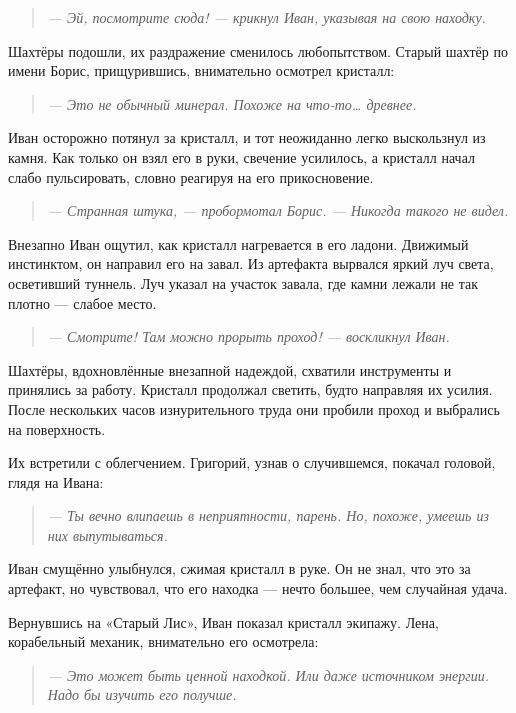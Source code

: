 \documentclass[12pt,a4paper]{book}
\newenvironment{dialogue}{\begin{quote}\itshape}{\end{quote}} %
\begin{document}
\begin{dialogue}
--- Эй, посмотрите сюда! --- крикнул Иван, указывая на свою находку.
\end{dialogue}

Шахтёры подошли, их раздражение сменилось любопытством. Старый шахтёр по имени Борис, прищурившись, внимательно осмотрел кристалл:

\begin{dialogue}
--- Это не обычный минерал. Похоже на что-то… древнее.
\end{dialogue}

Иван осторожно потянул за кристалл, и тот неожиданно легко выскользнул из камня. Как только он взял его в руки, свечение усилилось, а кристалл начал слабо пульсировать, словно реагируя на его прикосновение.

\begin{dialogue}
--- Странная штука, --- пробормотал Борис. --- Никогда такого не видел.
\end{dialogue}

Внезапно Иван ощутил, как кристалл нагревается в его ладони. Движимый инстинктом, он направил его на завал. Из артефакта вырвался яркий луч света, осветивший туннель. Луч указал на участок завала, где камни лежали не так плотно --- слабое место.

\begin{dialogue}
--- Смотрите! Там можно прорыть проход! --- воскликнул Иван.
\end{dialogue}

Шахтёры, вдохновлённые внезапной надеждой, схватили инструменты и принялись за работу. Кристалл продолжал светить, будто направляя их усилия. После нескольких часов изнурительного труда они пробили проход и выбрались на поверхность.

Их встретили с облегчением. Григорий, узнав о случившемся, покачал головой, глядя на Ивана:

\begin{dialogue}
--- Ты вечно влипаешь в неприятности, парень. Но, похоже, умеешь из них выпутываться.
\end{dialogue}

Иван смущённо улыбнулся, сжимая кристалл в руке. Он не знал, что это за артефакт, но чувствовал, что его находка --- нечто большее, чем случайная удача.

Вернувшись на «Старый Лис», Иван показал кристалл экипажу. Лена, корабельный механик, внимательно его осмотрела:

\begin{dialogue}
--- Это может быть ценной находкой. Или даже источником энергии. Надо бы изучить его получше.
\end{dialogue}
\end{document}
